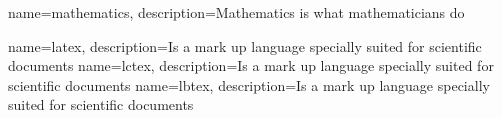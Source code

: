 {
    name=mathematics,
    description={Mathematics is what mathematicians do}
}

 
{
    name=latex,
    description={Is a mark up language specially suited 
    for scientific documents}
}
{
    name=lctex,
    description={Is a mark up language specially suited 
    for scientific documents}
}
{
    name=lbtex,
    description={Is a mark up language specially suited 
    for scientific documents}
}